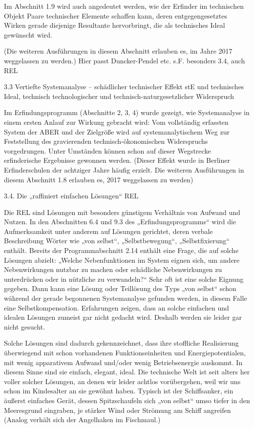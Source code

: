 \documentclass[12pt,a4paper]{article}
\begin{document}
Im Abschnitt 1.9 wird auch angedeutet werden, wie der Erfinder im technischen Objekt Paare technischer Elemente schaffen kann, deren entgegengesetztes Wirken gerade diejenige Resultante hervorbringt, die als technisches Ideal gewünscht wird.

(Die weiteren Ausführungen in diesem Abschnitt erlauben es, im Jahre 2017 weggelassen zu werden.) Hier passt Duncker-Pendel etc. s.F. besonders 3.4, auch REL 


3.3  Vertiefte Systemanalyse – schädlicher technischer Effekt stE und technisches Ideal, technisch technologischer und technisch-naturgesetzlicher Widerspruch

Im Erfindungsprogramm (Abschnitte 2, 3, 4) wurde gezeigt, wie Systemanalyse in einem ersten Anlauf zur Wirkung gebracht wird: Vom vollständig erfassten System der ABER und der Zielgröße wird auf systemanalytischem Weg zur Feststellung des gravierenden technisch-ökonomischen Widerspruchs vorgedrungen. Unter Umständen können schon auf dieser Wegstrecke erfinderische Ergebnisse gewonnen werden. (Dieser Effekt wurde in Berliner Erfinderschulen der achtziger Jahre häufig erzielt. Die weiteren Ausführungen in diesem Abschnitt 1.8 erlauben es, 2017 weggelassen zu werden)




3.4.  Die „raffiniert einfachen Lösungen“ REL

Die REL sind Lösungen mit besonders günstigem Verhältnis von Aufwand und Nutzen. In den Abschnitten 6.4 und 9.3 des „Erfindungsprogramms“ wird die Aufmerksamkeit unter anderem auf Lösungen gerichtet, deren verbale Beschreibung Wörter wie „von selbst“, „Selbstbewegung“, „Selbstfixierung“ enthält. Bereits der Programmabschnitt 2.14 enthält eine Frage, die auf solche Lösungen abzielt: „Welche Nebenfunktionen im System eignen sich, um andere Nebenwirkungen nutzbar zu machen oder schädliche Nebenwirkungen zu unterdrücken oder in nützliche zu verwandeln?“ Sehr oft ist eine solche Eignung gegeben. Dann kann eine Lösung oder Teillösung des Typs „von selbst“ schon während der gerade begonnenen Systemanalyse gefunden werden, in diesem Falle eine Selbstkompensation. Erfahrungen zeigen, dass an solche einfachen und idealen Lösungen zumeist gar nicht gedacht wird. Deshalb werden sie leider gar nicht gesucht. 

Solche Lösungen sind dadurch gekennzeichnet, dass ihre stoffliche Realisierung überwiegend mit schon vorhandenen Funktionseinheiten und Energiepotentialen, mit wenig apparativem Aufwand und/oder wenig Betriebsenergie auskommt. In diesem Sinne sind sie einfach, elegant, ideal. Die technische Welt ist seit alters her voller solcher Lösungen, an denen wir leider achtlos vorübergehen, weil wir uns schon im Kindesalter an sie gewöhnt haben. Typisch ist der Schiffsanker, ein äußerst einfaches Gerät, dessen Spitzschaufeln sich „von selbst“ umso tiefer in den Meeresgrund eingraben, je stärker Wind oder Strömung am Schiff angreifen (Analog verhält sich der Angelhaken im Fischmaul.)
\end{document}
